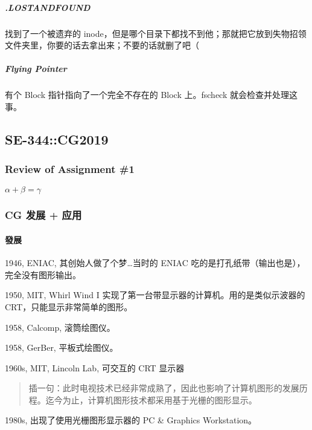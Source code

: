 \documentclass[
]{article}
\begin{document}
\hypertarget{header-n118}{%
\subparagraph{\texorpdfstring{.LOST\emph{AND}FOUND}{.LOSTANDFOUND}}\label{header-n118}}

找到了一个被遗弃的
inode，但是哪个目录下都找不到他；那就把它放到失物招领文件夹里，你要的话去拿出来；不要的话就删了吧（

\hypertarget{header-n120}{%
\subparagraph{Flying Pointer}\label{header-n120}}

有个 Block 指针指向了一个完全不存在的 Block 上。fscheck
就会检查并处理这事。

\hypertarget{header-n122}{%
\subsection{SE-344::CG2019}\label{header-n122}}

\hypertarget{header-n123}{%
\subsubsection{Review of Assignment \#1}\label{header-n123}}

\(\alpha + \beta = \gamma\)

\hypertarget{header-n125}{%
\subsubsection{CG 发展 + 应用}\label{header-n125}}

\hypertarget{header-n126}{%
\paragraph{發展}\label{header-n126}}

1946, ENIAC, 其创始人做了个梦\ldots 当时的 ENIAC
吃的是打孔纸带（输出也是），完全没有图形输出。

1950, MIT, Whirl Wind I 实现了第一台带显示器的计算机。用的是类似示波器的
CRT，只能显示非常简单的图形。

1958, Calcomp, 滚筒绘图仪。

1958, GerBer, 平板式绘图仪。

1960s, MIT, Lincoln Lab, 可交互的 CRT 显示器

\begin{quote}
插一句：此时电视技术已经非常成熟了，因此也影响了计算机图形的发展历程。迄今为止，计算机图形技术都采用基于光栅的图形显示。
\end{quote}

1980s, 出现了使用光栅图形显示器的 PC \& Graphics Workstation。
\end{document}
